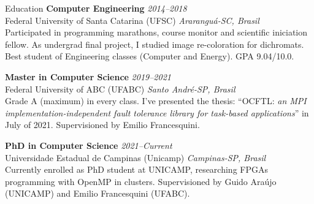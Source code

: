 \documentclass[a4paper]{resume}
\begin{document}
 


\begin{rSection}{Education}
{\bf Computer Engineering} \hfill {\em 2014--2018} \\
{\sc Federal University of Santa Catarina (UFSC)} \hfill {\em Araranguá-SC, Brasil} \\
Participated in programming marathons, course monitor and scientific iniciation fellow. 
As undergrad final project, I studied image re-coloration for dichromats.
Best student of Engineering classes (Computer and Energy). GPA 9.04/10.0.

{\bf Master in Computer Science} \hfill {\em 2019--2021} \\
{\sc Federal University of ABC (UFABC)} \hfill {\em Santo André-SP, Brasil} \\
Grade A (maximum) in every class. I've presented the thesis: ``OCFTL: {\it an MPI implementation-independent
fault tolerance library for task-based applications}'' in July of 2021. Supervisioned by Emilio Francesquini.

{\bf PhD in Computer Science} \hfill {\em 2021--Current} \\
{\sc Universidade Estadual de Campinas (Unicamp)} \hfill {\em Campinas-SP, Brasil} \\
Currently enrolled as PhD student at UNICAMP, researching FPGAs programming with OpenMP in clusters. 
Supervisioned by Guido Araújo (UNICAMP) and Emilio Francesquini (UFABC).
\end{rSection}

\end{document}
